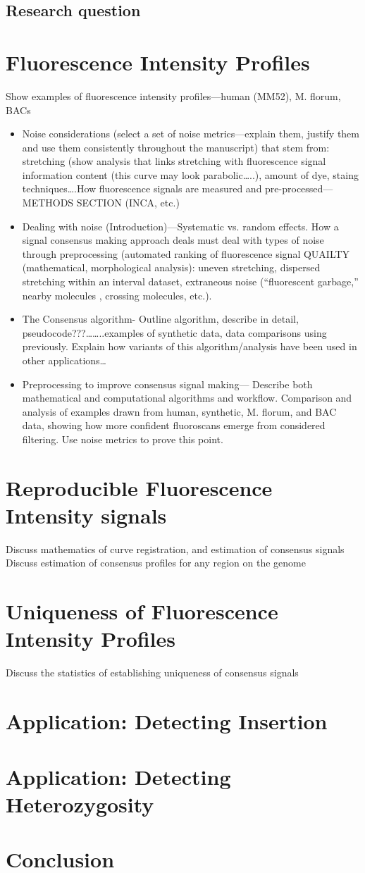 \documentclass[11pt]{extarticle} %
\begin{document}
\subsection{Research question}

\section{Fluorescence Intensity Profiles}
Show examples of fluorescence intensity profiles—human (MM52), M. florum,  BACs
\begin{itemize}
\item Noise considerations (select a set of noise metrics—explain them, justify them and use them consistently throughout the manuscript) that stem from: stretching (show analysis that links stretching with fluorescence signal information content (this curve may look parabolic…..), amount of dye, staing techniques….How fluorescence signals are measured and pre-processed—METHODS SECTION (INCA, etc.)
\item Dealing with noise (Introduction)—Systematic vs. random effects. How a signal consensus making approach deals must deal with types of noise through preprocessing (automated ranking of fluorescence signal QUAILTY (mathematical, morphological analysis): uneven stretching, dispersed stretching within an interval dataset, extraneous noise (“fluorescent garbage,” nearby molecules , crossing molecules, etc.). 
\item The Consensus algorithm- Outline algorithm, describe in detail, pseudocode???……..examples of synthetic data, data comparisons using previously. Explain how variants of this algorithm/analysis have been used in other applications…
\item Preprocessing to improve consensus signal making— Describe both mathematical and computational algorithms and workflow. Comparison and analysis of examples drawn from human, synthetic, M. florum, and BAC data, showing how more confident fluoroscans emerge from considered filtering. Use noise metrics to prove this point.
\end{itemize}

\section*{Reproducible Fluorescence Intensity signals}
Discuss mathematics of curve registration, and estimation of consensus signals
Discuss estimation of consensus profiles for any region on the genome

\section*{Uniqueness of Fluorescence Intensity Profiles}
Discuss the statistics of establishing uniqueness of consensus signals

\section*{Application: Detecting Insertion}

\section*{Application: Detecting Heterozygosity}

\section*{Conclusion}

\newpage

\end{document}
